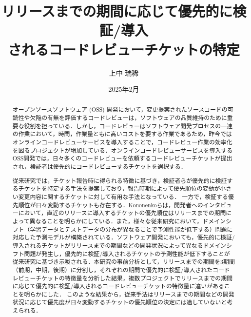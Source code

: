 \documentclass[11pt]{jreport}
\title{リリースまでの期間に応じて優先的に検証/導入\\されるコードレビューチケットの特定}
\author{上中 瑞稀}
\date{2025年2月}	%
\begin{document}
\maketitle

\begin{abstract}
オープンソースソフトウェア (OSS) 開発において，変更提案されたソースコードの可読性や欠陥の有無を評価するコードレビューは，ソフトウェアの品質維持のために重要な役割を担っている．しかし，コードレビューはソフトウェア開発プロセスの一連の作業において，時間，作業量ともに高いコストを要する作業であるため，昨今ではオンラインコードレビューサービスを導入することで，コードレビュー作業の効率化を図るプロジェクトが増加している．オンラインコードレビューサービスを導入するOSS開発では，日々多くのコードレビューを依頼するコードレビューチケットが提出され，検証者は優先的にコードレビューするチケットを選択する．

従来研究では，チケット報告時に得られる特徴に基づき，検証者らが優先的に検証するチケットを特定する手法を提案しており，報告時期によって優先順位の変動が小さい変更内容に関するチケットに対して有用な手法となっている．
一方で，検証する優先順位が日々変動するチケットも存在する．Kononenkoらは，開発者へのインタビューにおいて，直近のリリースに導入するチケットの優先順位はリリースまでの期間によって異なることを明らかにしている．また，様々な従来研究において，ドメインシフト（学習データとテストデータの分布が異なることで予測性能が低下する）問題に対応した予測モデルが構築されている．ソフトウェア開発においても，優先的に検証/導入されるチケットがリリースまでの期間などの開発状況によって異なるドメインシフト問題が発生し，優先的に検証/導入されるチケットの予測性能が低下することが従来研究に基づき示唆される．本研究の事前分析として，リリースまでの期間を3期間（前期，中期，後期）に分割し，それぞれの期間で優先的に検証/導入されたコードレビューチケットの特徴量を分析した結果，複数プロジェクトでリリースまでの期間に応じて優先的に検証/導入されるコードレビューチケットの特徴量に違いがあることを明らかにした．
このような結果から，従来手法はリリースまでの期間などの開発状況に応じて優先度が日々変動するチケットの優先順位の決定には適していないと考えられる．

\end{abstract}
\end{document}
